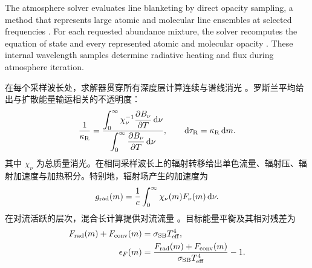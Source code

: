 \begin{EN}
The atmosphere solver evaluates line blanketing by direct opacity sampling, a
method that represents large atomic and molecular line ensembles at selected
frequencies \citep{JohnsonKrupp1976}. For each requested abundance mixture,
the solver recomputes the equation of state and every represented atomic and
molecular opacity \citep{Kurucz1996,KuruczAtlas12ASCL}. These internal wavelength samples
determine radiative heating and flux during atmosphere iteration.
\end{EN}

在每个采样波长处，求解器贯穿所有深度层计算连续与谱线消光 \citep{Mihalas1978}。罗斯兰平均给出与扩散能量输运相关的不透明度：
\begin{equation}
\frac{1}{\kappa_{\rm R}}=
\frac{\displaystyle\int_0^\infty
      \chi_\nu^{-1}\frac{\partial B_\nu}{\partial T}\,\mathrm{d}\nu}
     {\displaystyle\int_0^\infty
      \frac{\partial B_\nu}{\partial T}\,\mathrm{d}\nu},
\qquad \mathrm{d}\tau_{\rm R}=\kappa_{\rm R}\,\mathrm{d}m .
\end{equation}
\noindent 其中 $\chi_\nu$ 为总质量消光。在相同采样波长上的辐射转移给出单色流量、辐射压、辐射加速度与加热积分。特别地，辐射场产生的加速度为
\begin{equation}
g_{\rm rad}(m)=\frac{1}{c}\int_0^\infty
\chi_\nu(m)F_\nu(m)\,\mathrm{d}\nu .
\end{equation}
\noindent 在对流活跃的层次，混合长计算提供对流流量 \citep{BohmVitense1958,Mihalas1978,Gustafsson2008}。目标能量平衡及其相对残差为
\begin{equation}
\begin{aligned}
F_{\rm rad}(m)+F_{\rm conv}(m)
&=\sigma_{\rm SB}T_{\rm eff}^{4}, \\
\epsilon_F(m)
&=\frac{F_{\rm rad}(m)+F_{\rm conv}(m)}
        {\sigma_{\rm SB}T_{\rm eff}^{4}}-1 .
\end{aligned}
\end{equation}

